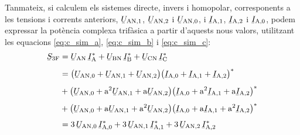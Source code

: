 Tanmateix, si calculem els sistemes directe, invers i homopolar,
corresponents a les tensions i corrents anteriors,
$\cmplx{U}\ped{AN,1}$, $\cmplx{U}\ped{AN,2}$ i
$\cmplx{U}\ped{AN,0}$, i $\cmplx{I}\ped{A,1}$,
$\cmplx{I}\ped{A,2}$ i $\cmplx{I}\ped{A,0}$, podem
expressar la potència complexa trifàsica a partir d'aquests nous
valors, utilitzant les equacions \eqref{eq:c_sim_a},
\eqref{eq:c_sim_b} i \eqref{eq:c_sim_c}:
\begin{equation}
\begin{split}
   \cmplx{S}\ped{3F} &= \cmplx{U}\ped{AN} \,\cmplx{I}\ped{A}^* +
   \cmplx{U}\ped{BN} \,\cmplx{I}\ped{B}^* +  \cmplx{U}\ped{CN} \,\cmplx{I}\ped{C}^*  \\[1ex]
   &= \big(\cmplx{U}\ped{AN,0} + \cmplx{U}\ped{AN,1} +
   \cmplx{U}\ped{AN,2}\big) \big(\cmplx{I}\ped{A,0} + \cmplx{I}\ped{A,1} +
   \cmplx{I}\ped{A,2}\big)^*   \\[1ex]
   &+ \big(\cmplx{U}\ped{AN,0} + \au^2 \cmplx{U}\ped{AN,1} +
   \au \cmplx{U}\ped{AN,2} \big) \big(\cmplx{I}\ped{A,0} + \au^2 \cmplx{I}\ped{A,1}
    + \au \cmplx{I}\ped{A,2} \big)^*  \\[1ex]
   &+ \big(\cmplx{U}\ped{AN,0} + \au \cmplx{U}\ped{AN,1} + \au^2
   \cmplx{U}\ped{AN,2} \big) \big(\cmplx{I}\ped{A,0} + \au
   \cmplx{I}\ped{A,1} + \au^2 \cmplx{I}\ped{A,2} \big)^*   \\[1ex]
   &= 3\, \cmplx{U}\ped{AN,0} \, \cmplx{I}\ped{A,0}^* +
      3\, \cmplx{U}\ped{AN,1} \, \cmplx{I}\ped{A,1}^* +
      3\, \cmplx{U}\ped{AN,2}\,  \cmplx{I}\ped{A,2}^*
    \label{eq:c_sim_s}
\end{split}
\end{equation}


